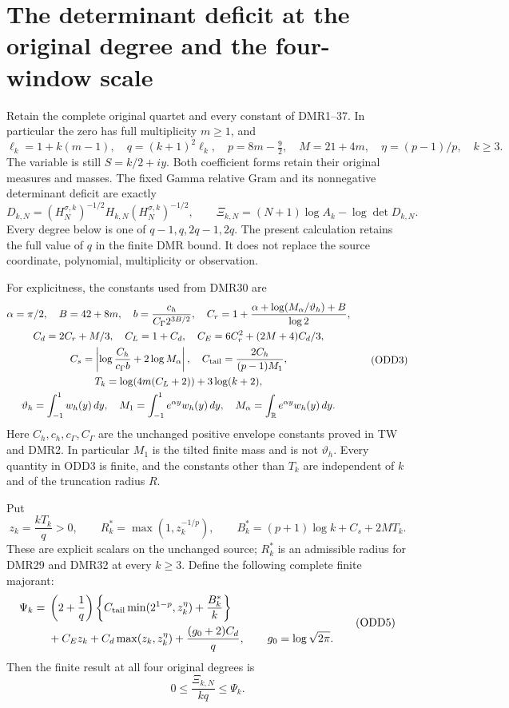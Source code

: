 \section{The determinant deficit at the original degree and the four-window scale}
\label{sec:original-degree-deficit}

Retain the complete original quartet and every constant of DMR1--37.
In particular the zero has full multiplicity $m\geq1$, and
\[
 \ell_k=1+k(m-1),\quad q=(k+1)^2\ell_k,\quad
 p=8m-\tfrac92,\quad M=21+4m,\quad
 \eta=(p-1)/p,\quad k\geq3.
 \tag{ODD1}
\]
The variable is still $S=k/2+iy$. Both coefficient forms retain
their original measures and masses. The fixed Gamma relative Gram
and its nonnegative determinant deficit are exactly
\[
 D_{k,N}=(H^{\sigma,k}_N)^{-1/2}H_{k,N}(H^{\sigma,k}_N)^{-1/2},
 \qquad \Xi_{k,N}=(N+1)\log A_k-\log\det D_{k,N}.
 \tag{ODD2}
\]
Every degree below is one of $q-1,q,2q-1,2q$. The present
calculation retains the full value of $q$ in the finite DMR bound.
It does not replace the source coordinate, polynomial, multiplicity
or observation.

For explicitness, the constants used from DMR30 are
\[
\begin{gathered}
 \alpha=\pi/2,\quad B=42+8m,\quad
 b=\frac{c_h}{C_\Gamma 2^{3B/2}},\quad
 C_r=1+\frac{\alpha+\log(M_\alpha/\vartheta_h)+B}{\log2},\\
 C_d=2C_r+M/3,\quad C_L=1+C_d,\quad
 C_E=6C_r^2+(2M+4)C_d/3,\\
 C_s=\left|\log\frac{C_h}{c_\Gamma b}+2\log M_\alpha\right|,
 \quad C_{\rm tail}=\frac{2C_h}{(p-1)M_1},\\
 T_k=\log(4m(C_L+2))+3\log(k+2),\\
 \vartheta_h=\int_{-1}^1w_h(y)\,dy,\quad
 M_1=\int_{-1}^1e^{\alpha y}w_h(y)\,dy,\quad
 M_\alpha=\int_{\mathbb R}e^{\alpha y}w_h(y)\,dy .
\end{gathered}\tag{ODD3}
\]
Here $C_h,c_h,c_\Gamma,C_\Gamma$ are the unchanged positive
envelope constants proved in TW and DMR2. In particular $M_1$
is the tilted finite mass and is not $\vartheta_h$. Every
quantity in ODD3 is finite, and the constants other than $T_k$
are independent of $k$ and of the truncation radius $R$.

Put
\[
 z_k=\frac{kT_k}{q}>0,\qquad
 R_k^*=\max(1,z_k^{-1/p}),\qquad
 B_k^*=(p+1)\log k+C_s+2MT_k.
 \tag{ODD4}
\]
These are explicit scalars on the unchanged source; $R_k^*$ is
an admissible radius for DMR29 and DMR32 at every $k\geq3$.
Define the following complete finite majorant:
\[
\begin{split}
 \Psi_k={}&\left(2+\frac1q\right)
 \left\{C_{\rm tail}\min(2^{1-p},z_k^\eta)
                       +\frac{B_k^*}{k}\right\}\\
 &+C_Ez_k+C_d\max(z_k,z_k^\eta)
                       +\frac{(g_0+2)C_d}{q},
 \qquad g_0=\log\sqrt{2\pi}.
\end{split}\tag{ODD5}
\]
Then the finite result at all four original degrees is
\[
 \boxed{\quad 0\leq\frac{\Xi_{k,N}}{kq}\leq\Psi_k.\quad}
 \tag{ODD6}
\]

